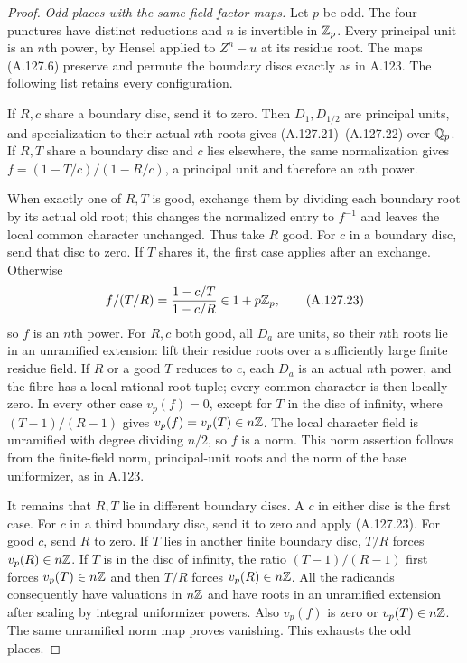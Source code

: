 \begin{proof}
\emph{Odd places with the same field-factor maps.}
Let $p$ be odd.
The four punctures have distinct reductions and
$n$ is invertible in $\mathbb Z_p$.
Every principal unit is an $n$th power, by
Hensel applied to $Z^n-u$ at its residue root.
The maps (A.127.6) preserve and permute the
boundary discs exactly as in A.123.
The following list retains every configuration.

If $R,c$ share a boundary disc, send it to
zero.
Then $D_1,D_{1/2}$ are principal units, and
specialization to their actual $n$th roots
gives (A.127.21)--(A.127.22) over $\mathbb Q_p$.
If $R,T$ share a boundary disc and $c$ lies
elsewhere, the same normalization gives
$f=(1-T/c)/(1-R/c)$, a principal unit and
therefore an $n$th power.

When exactly one of $R,T$ is good, exchange
them by dividing each boundary root by its
actual old root; this changes the normalized
entry to $f^{-1}$ and leaves the local common
character unchanged.
Thus take $R$ good.
For $c$ in a boundary disc, send that disc to
zero.
If $T$ shares it, the first case applies after
an exchange.
Otherwise
\[
                     f/(T/R)=\frac{1-c/T}{1-c/R}
                                        \in1+p\mathbb Z_p,
\tag{A.127.23}
\]
so $f$ is an $n$th power.
For $R,c$ both good, all $D_a$ are units, so
their $n$th roots lie in an unramified extension:
lift their residue roots over a sufficiently
large finite residue field.
If $R$ or a good $T$ reduces to $c$, each $D_a$
is an actual $n$th power, and the fibre has
a local rational root tuple; every common
character is then locally zero.
In every other case $v_p(f)=0$, except for
$T$ in the disc of infinity, where
$(T-1)/(R-1)$ gives $v_p(f)=v_p(T)\in n\mathbb Z$.
The local character field is unramified with
degree dividing $n/2$, so $f$ is a norm.
This norm assertion follows from the finite-field
norm, principal-unit roots and the norm of
the base uniformizer, as in A.123.

It remains that $R,T$ lie in different boundary
discs.
A $c$ in either disc is the first case.
For $c$ in a third boundary disc, send it to
zero and apply (A.127.23).
For good $c$, send $R$ to zero.
If $T$ lies in another finite boundary disc,
$T/R$ forces $v_p(R)\in n\mathbb Z$.
If $T$ is in the disc of infinity, the ratio
$(T-1)/(R-1)$ first forces $v_p(T)\in n\mathbb Z$
and then $T/R$ forces $v_p(R)\in n\mathbb Z$.
All the radicands consequently have valuations
in $n\mathbb Z$ and have roots in an unramified
extension after scaling by integral uniformizer
powers.
Also $v_p(f)$ is zero or $v_p(T)\in n\mathbb Z$.
The same unramified norm map proves vanishing.
This exhausts the odd places.


\end{proof}
